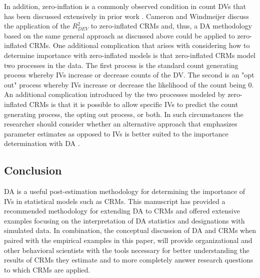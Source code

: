 \documentclass[doc]{apa7}
\begin{document}
	In addition, zero-inflation is a commonly observed condition in count DVs that has been discussed extensively in prior work \parencite[e.g.,][]{blevins2015count}. 
	Cameron and Windmeijer \parencite*{cameron1996r} discuss the application of the $R^2_{DEV}$ to zero-inflated CRMs and, thus, a DA methodology based on the same general approach as discussed above could be applied to zero-inflated CRMs.
	One additional complication that arises with considering how to determine importance with zero-inflated models is that zero-inflated CRMs model two processes in the data. 
	The first process is the standard count generating process whereby IVs increase or decrease counts of the DV.
	The second is an "opt out" process whereby IVs increase or decrease the likelihood of the count being 0.
	An additional complication introduced by the two processes modeled by zero-inflated CRMs is that it is possible to allow specific IVs to predict the count generating process, the opting out process, or both.
	In such circumstances the researcher should consider whether an alternative approach that emphasizes parameter estimates as opposed to IVs is better suited to the importance determination with DA \parencite{luchman2020relative}.
	
	\subsection{Conclusion}
	
	DA is a useful post-estimation methodology for determining the importance of IVs in statistical models such as CRMs.
	This manuscript has provided a recommended methodology for extending DA to CRMs and offered extensive examples focusing on the interpretation of DA statistics and designations with simulated data.
	In combination, the conceptual discussion of DA and CRMs when paired with the empirical examples in this paper, will provide organizational and other behavioral scientists with the tools necessary for better understanding the results of CRMs they estimate and to more completely answer research questions to which CRMs are applied.

\printbibliography
	
\end{document}
